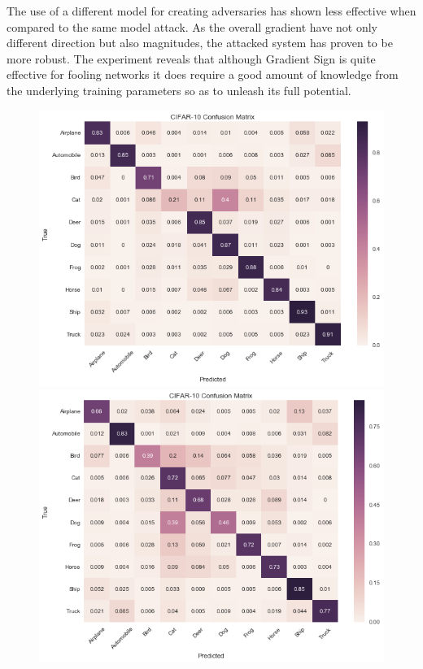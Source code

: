 \documentclass[runningheads,a4paper]{llncs}
\begin{document}
The use of a different model for creating adversaries has shown less effective when compared to the same model attack. As the overall gradient have not only different direction but also magnitudes, the attacked system has proven to be more robust. The experiment reveals that although Gradient Sign is quite effective for fooling networks it does require a good amount of knowledge from the underlying training parameters so as to unleash its full potential. 
\begin{figure}
	\label{fig7} 
	\begin{minipage}[b]{0.5\linewidth}
		\centering
		\includegraphics[width=1\linewidth]{cat_undersampling_per.png} 
	\end{minipage}%
	\begin{minipage}[b]{0.5\linewidth}
		\centering
		\includegraphics[width=1\linewidth]{cat_oversampling_per.png} 

\end{minipage}
\end{figure}
\end{document}
